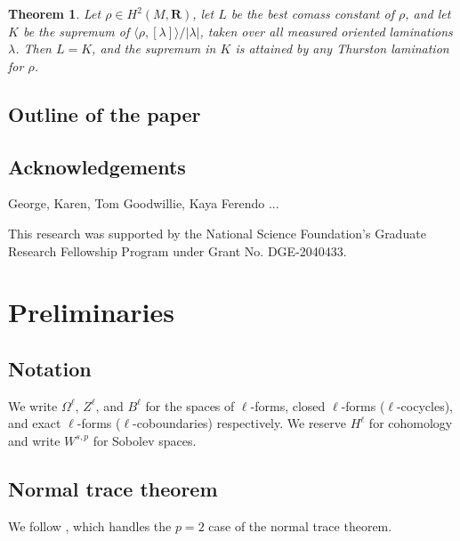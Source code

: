 \documentclass[reqno,11pt]{amsart}
\newcommand{\RR}{\mathbf{R}}
\newtheorem{mainthm}{Theorem}
\theoremstyle{definition}
\numberwithin{equation}{section}
\begin{document}
\begin{mainthm}
Let $\rho \in H^2(M, \RR)$, let $L$ be the best comass constant of $\rho$, and let $K$ be the supremum of $\langle \rho, [\lambda]\rangle/|\lambda|$, taken over all measured oriented laminations $\lambda$.
Then $L = K$, and the supremum in $K$ is attained by any Thurston lamination for $\rho$.
\end{mainthm}

\subsection{Outline of the paper}
 
\subsection{Acknowledgements}
George, Karen, Tom Goodwillie, Kaya Ferendo ...

This research was supported by the National Science Foundation's Graduate Research Fellowship Program under Grant No. DGE-2040433.

\section{Preliminaries}
\subsection{Notation}
We write $\Omega^\ell$, $Z^\ell$, and $B^\ell$ for the spaces of $\ell$-forms, closed $\ell$-forms ($\ell$-cocycles), and exact $\ell$-forms ($\ell$-coboundaries) respectively.
We reserve $H^\ell$ for cohomology and write $W^{s, p}$ for Sobolev spaces.

\subsection{Normal trace theorem}
We follow \cite[Chapter I, Theorem 1.2]{temam2016navier}, which handles the $p = 2$ case of the normal trace theorem.
\end{document}

